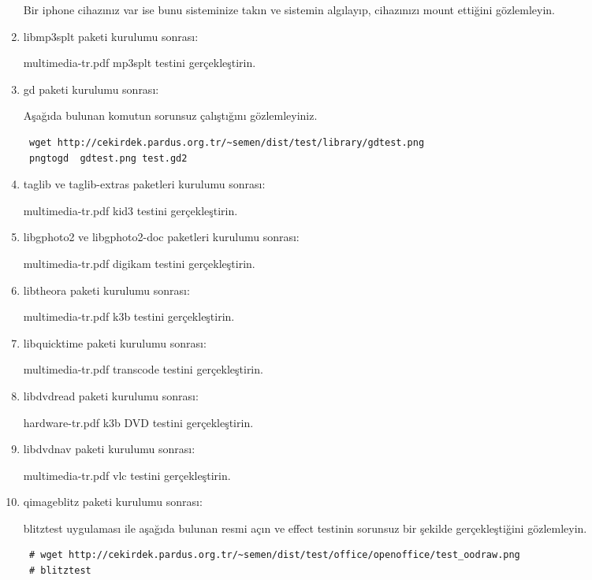 \documentclass[a4paper,10pt]{article}
\begin{document}
\begin{enumerate}
Bir iphone cihazınız var ise bunu sisteminize takın ve sistemin algılayıp, cihazınızı mount ettiğini gözlemleyin.

\item libmp3splt paketi kurulumu sonrası:

multimedia-tr.pdf mp3splt testini gerçekleştirin.

\item gd paketi kurulumu sonrası:

Aşağıda bulunan komutun sorunsuz çalıştığını gözlemleyiniz.

\begin{verbatim}
 wget http://cekirdek.pardus.org.tr/~semen/dist/test/library/gdtest.png
 pngtogd  gdtest.png test.gd2
\end{verbatim}

\item taglib ve taglib-extras paketleri kurulumu sonrası:

multimedia-tr.pdf kid3 testini gerçekleştirin.

\item libgphoto2 ve libgphoto2-doc paketleri kurulumu sonrası:

multimedia-tr.pdf digikam testini gerçekleştirin.

\item libtheora paketi kurulumu sonrası:

multimedia-tr.pdf k3b testini gerçekleştirin.

\item libquicktime paketi kurulumu sonrası:

multimedia-tr.pdf transcode testini gerçekleştirin.

\item libdvdread paketi kurulumu sonrası:

hardware-tr.pdf k3b DVD testini gerçekleştirin.

\item libdvdnav paketi kurulumu sonrası:

multimedia-tr.pdf vlc testini gerçekleştirin.

\item qimageblitz paketi kurulumu sonrası:

blitztest uygulaması ile aşağıda bulunan resmi açın ve effect testinin sorunsuz bir şekilde gerçekleştiğini gözlemleyin.
\begin{verbatim}
 # wget http://cekirdek.pardus.org.tr/~semen/dist/test/office/openoffice/test_oodraw.png
 # blitztest
\end{verbatim}



\end{enumerate}
\end{document}
